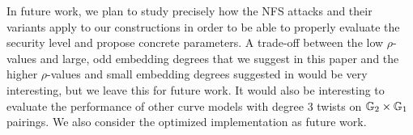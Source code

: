 In future work,
we plan to study precisely how the NFS attacks and their variants apply to our constructions in order to be able to
properly evaluate the security level and propose concrete parameters.
A trade-off between the low $\rho$-values and large, odd embedding degrees that we suggest in this paper and the higher $\rho$-values and small embedding degrees suggested in \cite{2018/FK} would be very interesting, but we leave this for future work.
It would also be interesting to evaluate the performance of other curve models with degree 3 twists on $\mathbb{G}_{2} \times \mathbb{G}_{1}$ pairings.
We also consider the optimized implementation as future work.






